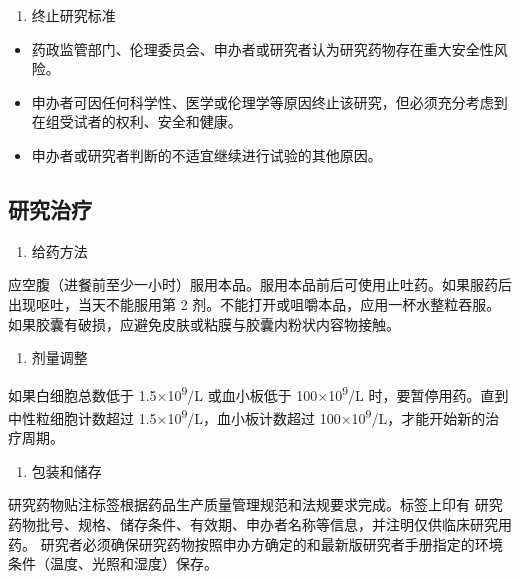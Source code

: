 \documentclass[
  chinese-hans,
  letterpaper,
  DIV=11,
  numbers=noendperiod]{scrreprt}
\providecommand{\tightlist}{%
  \setlength{\itemsep}{0pt}\setlength{\parskip}{0pt}}
\begin{document}
\begin{enumerate}
\def\labelenumi{\arabic{enumi}.}
\setcounter{enumi}{3}
\tightlist
\item
  终止研究标准
\end{enumerate}

\begin{itemize}
\item
  药政监管部门、伦理委员会、申办者或研究者认为研究药物存在重大安全性风险。
\item
  申办者可因任何科学性、医学或伦理学等原因终止该研究，但必须充分考虑到在组受试者的权利、安全和健康。
\item
  申办者或研究者判断的不适宜继续进行试验的其他原因。
\end{itemize}

\subsection{研究治疗}\label{ux7814ux7a76ux6cbbux7597}

\begin{enumerate}
\def\labelenumi{\arabic{enumi}.}
\tightlist
\item
  给药方法
\end{enumerate}

应空腹（进餐前至少一小时）服用本品。服用本品前后可使用止吐药。如果服药后出现呕吐，当天不能服用第
2
剂。不能打开或咀嚼本品，应用一杯水整粒吞服。如果胶囊有破损，应避免皮肤或粘膜与胶囊内粉状内容物接触。

\begin{enumerate}
\def\labelenumi{\arabic{enumi}.}
\setcounter{enumi}{1}
\tightlist
\item
  剂量调整
\end{enumerate}

如果白细胞总数低于 1.5×10\textsuperscript{9}/L 或血小板低于
100×10\textsuperscript{9}/L 时，要暂停用药。直到中性粒细胞计数超过
1.5×10\textsuperscript{9}/L，血小板计数超过
100×10\textsuperscript{9}/L，才能开始新的治疗周期。

\begin{enumerate}
\def\labelenumi{\arabic{enumi}.}
\setcounter{enumi}{2}
\tightlist
\item
  包装和储存
\end{enumerate}

研究药物贴注标签根据药品生产质量管理规范和法规要求完成。标签上印有
研究药物批号、规格、储存条件、有效期、申办者名称等信息，并注明仅供临床研究用药。
研究者必须确保研究药物按照申办方确定的和最新版研究者手册指定的环境条件（温度、光照和湿度）保存。
\end{document}
